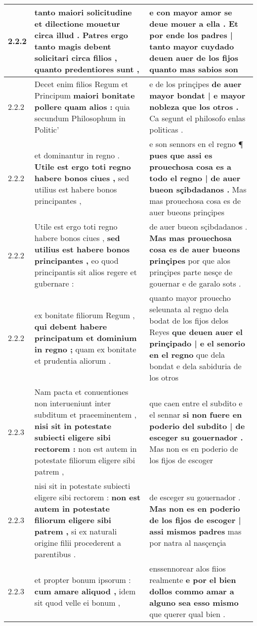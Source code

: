 \begin{tabular}{|p{1cm}|p{6.5cm}|p{6.5cm}|}
2.2.2 & tanto maiori solicitudine et dilectione mouetur circa illud . \textbf{ Patres ergo tanto magis debent solicitari circa filios , } quanto predentiores sunt , & e con mayor amor se deue mouer a ella . \textbf{ Et por ende los padres | tanto mayor cuydado deuen auer de los fijos } quanto mas sabios son \\\hline
2.2.2 & Decet enim filios Regum et Principum \textbf{ maiori bonitate pollere quam alios : } quia secundum Philosophum in Politic’ & e de los prinçipes \textbf{ de auer mayor bondat | e mayor nobleza que los otros . } Ca segunt el philosofo enlas politicas . \\\hline
2.2.2 & et dominantur in regno . \textbf{ Utile est ergo toti regno habere bonos ciues , } sed utilius est habere bonos principantes , & e son sennors en el regno ¶ \textbf{ pues que assi es prouechosa cosa es a todo el regno | de auer bueon sçibdadanos . } Mas mas prouechosa cosa es de auer bueons prinçipes \\\hline
2.2.2 & Utile est ergo toti regno habere bonos ciues , \textbf{ sed utilius est habere bonos principantes , } eo quod principantis sit alios regere et gubernare : & de auer bueon sçibdadanos . \textbf{ Mas mas prouechosa cosa es de auer bueons prinçipes } por que alos prinçipes parte nesçe de gouernar e de garalo sots . \\\hline
2.2.2 & ex bonitate filiorum Regum , \textbf{ qui debent habere principatum et dominium in regno ; } quam ex bonitate et prudentia aliorum . & quanto mayor prouecho seleunata al regno dela bodat de los fijos delos Reyes \textbf{ que deuen auer el prinçipado | e el senorio en el regno } que dela bondat e dela sabiduria de los otros \\\hline
2.2.3 & Nam pacta et conuentiones non interueniunt inter subditum et praeeminentem , \textbf{ nisi sit in potestate subiecti eligere sibi rectorem : } non est autem in potestate filiorum eligere sibi patrem , & que caen entre el subdito e el sennar \textbf{ si non fuere en poderio del subdito | de esceger su gouernador . } Mas non es en poderio de los fijos de escoger \\\hline
2.2.3 & nisi sit in potestate subiecti eligere sibi rectorem : \textbf{ non est autem in potestate filiorum eligere sibi patrem , } si ex naturali origine filii procederent a parentibus . & de esceger su gouernador . \textbf{ Mas non es en poderio de los fijos de escoger | assi mismos padres } mas por natra al nasçençia \\\hline
2.2.3 & et propter bonum ipsorum : \textbf{ cum amare aliquod , } idem sit quod velle ei bonum , & enssennorear alos fiios realmente \textbf{ e por el bien dollos commo amar a alguno sea esso mismo } que querer qual bien . \\\hline

\end{tabular}
